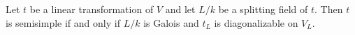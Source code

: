Let $t$ be a linear transformation of $V$ and let $L/k$ be a splitting field of $t$. Then $t$ is semisimple if and only if $L/k$ is Galois and $t_L$ is diagonalizable on $V_L$.
